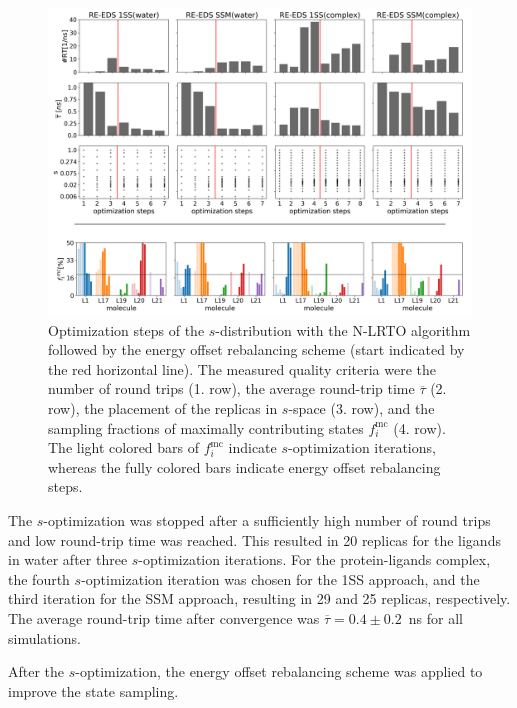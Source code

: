 \begin{figure}[h]
\centering
\includegraphics[width=\textwidth]{fig/results/ringOpening/paramOptimization/S-optimization_ringOpening.png}
\caption{Optimization steps of the $s$-distribution with the N-LRTO \cite{Sidler2017} algorithm followed by the energy offset rebalancing scheme (start indicated by the red horizontal line). The measured quality criteria were the number of round trips (1. row), the average round-trip time $\overline{\tau}$ (2. row), the placement of the replicas in $s$-space (3. row), and the sampling fractions of maximally contributing states $f_{i}^{\text{mc}}$ (4. row). The light colored bars of $f_{i}^{\text{mc}}$ indicate $s$-optimization iterations, whereas the fully colored bars indicate energy offset rebalancing steps. }
\label{fig: CHK1_RingOpening_sOptimization}
\end{figure}



The $s$-optimization was stopped after a sufficiently high number of round trips and low round-trip time was reached. 
This resulted in 20 replicas for the ligands in water after three $s$-optimization iterations.
For the protein-ligands complex, the fourth $s$-optimization iteration was chosen for the 1SS approach, and the third iteration for the SSM approach, resulting in 29 and 25 replicas, respectively. 
The average round-trip time after convergence was $\overline{\tau} = 0.4 \pm 0.2$~ns for all simulations.

After the $s$-optimization, the energy offset rebalancing scheme was applied to improve the state sampling. 

